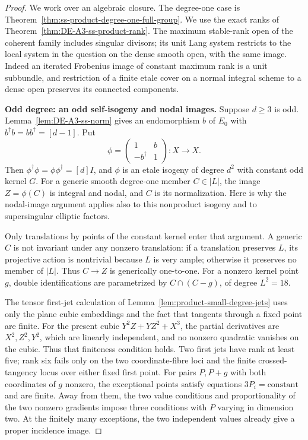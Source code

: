 \begin{proof}
We work over an algebraic closure. The degree-one case is
Theorem~\ref{thm:ss-product-degree-one-full-group}.
We use the exact ranks of Theorem~\ref{thm:DE-A3-ss-product-rank}.
The maximum stable-rank open of the coherent family includes singular
divisors; its unit Lang system restricts to the local system in the
question on the dense smooth open, with the same image.
Indeed an iterated Frobenius image of constant maximum rank is a
unit subbundle, and restriction of a finite etale cover on a normal
integral scheme to a dense open preserves its connected components.

\par\smallskip\noindent\textbf{Odd degree: an odd self-isogeny and nodal images.}
Suppose $d\ge3$ is odd. Lemma~\ref{lem:DE-A3-ss-norm} gives an
endomorphism $b$ of $E_0$ with $b^\dagger b=bb^\dagger=[d-1]$.
Put
\[
 \phi=\begin{pmatrix}1&b\\-b^\dagger&1\end{pmatrix}:X\longrightarrow X.
\]
Then $\phi^\dagger\phi=\phi\phi^\dagger=[d]I$, and $\phi$ is
an etale isogeny of degree $d^2$ with constant odd kernel $G$.
For a generic smooth degree-one member $C\in|L|$, the image
$Z=\phi(C)$ is integral and nodal, and $C$ is its normalization.
Here is why the nodal-image argument applies also to this nonproduct
isogeny and to supersingular elliptic factors.

Only translations by points of the constant kernel enter that argument.
A generic $C$ is not invariant under any nonzero translation: if a
translation preserves $L$, its projective action is nontrivial because
$L$ is very ample; otherwise it preserves no member of $|L|$.
Thus $C\to Z$ is generically one-to-one. For a nonzero kernel point
$g$, double identifications are parametrized by
$C\cap(C-g)$, of degree $L^2=18$.

The tensor first-jet calculation of
Lemma~\ref{lem:product-small-degree-jets} uses only the plane cubic
embeddings and the fact that tangents through a fixed point are finite.
For the present cubic $Y^2Z+YZ^2+X^3$, the partial derivatives are
$X^2,Z^2,Y^2$, which are linearly independent, and no nonzero quadratic
vanishes on the cubic. Thus that finiteness condition holds.
Two first jets have rank at least five; rank six fails only on the
two coordinate-fibre loci and the finite crossed-tangency locus
over either fixed first point. For pairs $P,P+g$ with both coordinates
of $g$ nonzero, the exceptional points satisfy equations
$3P_i=\text{constant}$ and are finite. Away from them, the two value
conditions and proportionality of the two nonzero gradients impose
three conditions with $P$ varying in dimension two.
At the finitely many exceptions, the two independent values already
give a proper incidence image.


\end{proof}
